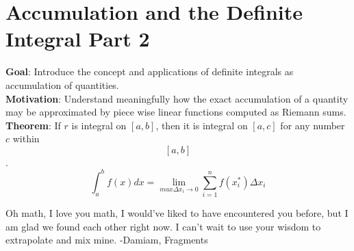 \documentclass[12pt, letterpaper]{article}
\begin{document}
\section{Accumulation and the Definite Integral Part 2}
\textbf{Goal}: Introduce the concept and applications of definite integrals as accumulation of quantities.\\
\newline
\textbf{Motivation}: Understand meaningfully how the exact accumulation of a quantity may be approximated by piece wise linear functions computed as Riemann sums.\\
\newline
\textbf{Theorem}: If \(r\) is integral on \([a,b]\), then it is integral on \([a,c]\) for any number \(c\) within \[[a,b]\].
\[\int_{a}^{b}f(x)dx=\lim_{max \Delta x_i \to 0} \sum_{i=1}^{n}f(x_i^*)\Delta x_i\]



Oh math, I love you math, I would've liked to have encountered you before, but I am glad we found each other right now. I can't wait to use your wisdom to extrapolate and mix mine. 
-Damiam, Fragments
\end{document}
